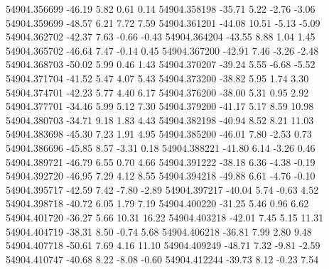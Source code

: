 54904.356699      -46.19        5.82        0.61        0.14
54904.358198      -35.71        5.22       -2.76       -3.06
54904.359699      -48.57        6.21        7.72        7.59
54904.361201      -44.08       10.51       -5.13       -5.09
54904.362702      -42.37        7.63       -0.66       -0.43
54904.364204      -43.55        8.88        1.04        1.45
54904.365702      -46.64        7.47       -0.14        0.45
54904.367200      -42.91        7.46       -3.26       -2.48
54904.368703      -50.02        5.99        0.46        1.43
54904.370207      -39.24        5.55       -6.68       -5.52
54904.371704      -41.52        5.47        4.07        5.43
54904.373200      -38.82        5.95        1.74        3.30
54904.374701      -42.23        5.77        4.40        6.17
54904.376200      -38.00        5.31        0.95        2.92
54904.377701      -34.46        5.99        5.12        7.30
54904.379200      -41.17        5.17        8.59       10.98
54904.380703      -34.71        9.18        1.83        4.43
54904.382198      -40.94        8.52        8.21       11.03
54904.383698      -45.30        7.23        1.91        4.95
54904.385200      -46.01        7.80       -2.53        0.73
54904.386696      -45.85        8.57       -3.31        0.18
54904.388221      -41.80        6.14       -3.26        0.46
54904.389721      -46.79        6.55        0.70        4.66
54904.391222      -38.18        6.36       -4.38       -0.19
54904.392720      -46.95        7.29        4.12        8.55
54904.394218      -49.88        6.61       -4.76       -0.10
54904.395717      -42.59        7.42       -7.80       -2.89
54904.397217      -40.04        5.74       -0.63        4.52
54904.398718      -40.72        6.05        1.79        7.19
54904.400220      -31.25        5.46        0.96        6.62
54904.401720      -36.27        5.66       10.31       16.22
54904.403218      -42.01        7.45        5.15       11.31
54904.404719      -38.31        8.50       -0.74        5.68
54904.406218      -36.81        7.99        2.80        9.48
54904.407718      -50.61        7.69        4.16       11.10
54904.409249      -48.71        7.32       -9.81       -2.59
54904.410747      -40.68        8.22       -8.08       -0.60
54904.412244      -39.73        8.12       -0.23        7.54

